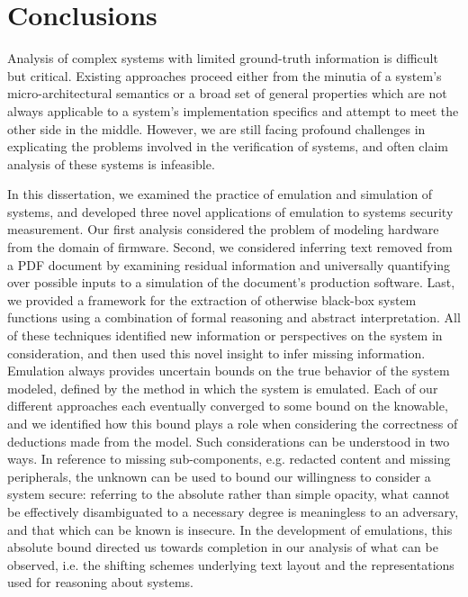 \chapter{Conclusions}
\label{chap:conclusion}

Analysis of complex systems with limited ground-truth information is difficult but critical.
Existing approaches proceed either from the minutia of a system's micro-architectural semantics or a broad set of general properties which are not always applicable to a system's implementation specifics and attempt to meet the other side in the middle.
However, we are still facing profound challenges in explicating the problems involved in the verification of systems, and often claim analysis of these systems is infeasible.

In this dissertation, we examined the practice of emulation and simulation of systems, and developed three novel applications of emulation to systems security measurement.
Our first analysis considered the problem of modeling hardware from the domain of firmware.
Second, we considered inferring text removed from a PDF document by examining residual information and universally quantifying over possible inputs to a simulation of the document's production software.
Last, we provided a framework for the extraction of otherwise black-box system functions using a combination of formal reasoning and abstract interpretation.
All of these techniques identified new information or perspectives on the system in consideration, and then used this novel insight to infer missing information.
Emulation always provides uncertain bounds on the true behavior of the system modeled, defined by the method in which the system is emulated.
Each of our different approaches each eventually converged to some bound on the knowable, and we identified how this bound plays a role when considering the correctness of deductions made from the model.
Such considerations can be understood in two ways.
In reference to missing sub-components, e.g. redacted content and missing peripherals, the unknown can be used to bound our willingness to consider a system secure: referring to the absolute rather than simple opacity, what cannot be effectively disambiguated to a necessary degree is meaningless to an adversary, and that which can be known is insecure.
In the development of emulations, this absolute bound directed us towards completion in our analysis of what can be observed, i.e. the shifting schemes underlying text layout and the representations used for reasoning about systems.

